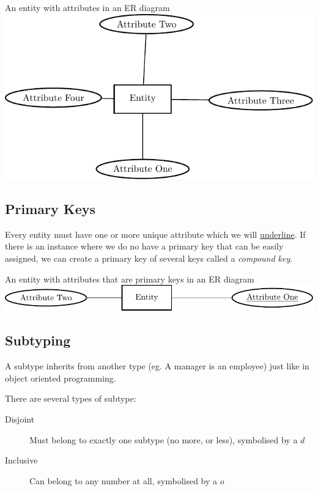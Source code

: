 \begin{highlight}{An entity with attributes in an ER diagram}
    \includegraphics{lualatex/dsr/3/attribute.pdf}
\end{highlight}

\subsection{Primary Keys}\label{sub:primary_keys}

Every entity must have one or more unique attribute which we will \underline{underline}.
If there is an instance where we do no have a primary key that can be easily assigned, we can create a primary key of several keys called a \emph{compound key}.

\begin{highlight}{An entity with attributes that are primary keys in an ER diagram}
    \includegraphics{lualatex/dsr/3/primarykeys.pdf}
\end{highlight}

\subsection{Subtyping}\label{sub:sub_typing}

A subtype inherits from another type (eg. A manager is an employee) just like in object oriented programming.

There are several types of subtype:
\begin{description}
    \item[Disjoint] Must belong to exactly one subtype (no more, or less), symbolised by a \(d\)
    \item[Inclusive] Can belong to any number at all, symbolised by a \(o\)
\end{description}

